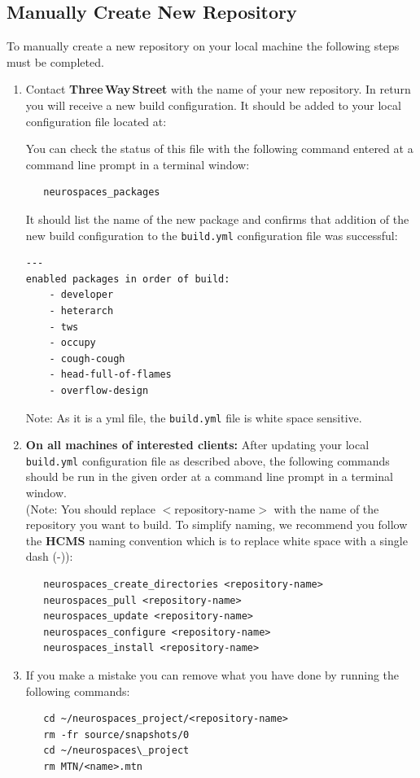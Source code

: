 \documentclass[12pt]{article}
\begin{document}
\subsection*{Manually Create New Repository}

To manually create a new repository on your local machine the following steps must be completed. 

\begin{enumerate}
\item Contact {\bf \small Three\,Way\,Street} with the name of your new repository. In return you will receive a new build configuration. It should be added to your local configuration file located at:\\
  \hspace*{5mm}{\tt /etc/neurospaces/developer/build.yml}
  
You can check the status of this file with the following command entered at a command line prompt in a terminal window:
\begin{verbatim}
   neurospaces_packages
\end{verbatim}
It should list the name of the new package and confirms that addition of the new build configuration to the {\tt \small build.yml} configuration file was successful:
\begin{verbatim}
---
enabled packages in order of build:
    - developer
    - heterarch
    - tws
    - occupy
    - cough-cough
    - head-full-of-flames
    - overflow-design
\end{verbatim}
Note: As it is a yml file, the {\tt \small build.yml} file is white space sensitive.

\item {\bf On all machines of interested clients:} After updating your local {\tt \small build.yml} configuration file as described above, the following commands should  be run in the given order at a command line prompt  in a terminal window.\\
(Note: You should replace $<$repository-name$>$ with the name of the repository you want to build. To simplify naming, we recommend you follow the {\bf \small HCMS} naming convention which is to replace white space with a single dash (-)):
\begin{verbatim}
   neurospaces_create_directories <repository-name>
   neurospaces_pull <repository-name>
   neurospaces_update <repository-name>
   neurospaces_configure <repository-name>
   neurospaces_install <repository-name>
\end{verbatim}
\item If you make a mistake you can remove what you have done by running the following commands:
\begin{verbatim}
   cd ~/neurospaces_project/<repository-name>
   rm -fr source/snapshots/0
   cd ~/neurospaces\_project
   rm MTN/<name>.mtn
\end{verbatim}


\end{enumerate}
\end{document}
